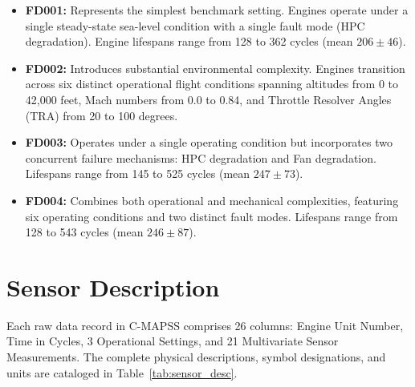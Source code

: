 \documentclass[12pt,a4paper,oneside]{report}
\begin{document}
\begin{itemize}
    \item \textbf{FD001:} Represents the simplest benchmark setting. Engines operate under a single steady-state sea-level condition with a single fault mode (HPC degradation). Engine lifespans range from 128 to 362 cycles (mean $206 \pm 46$).
    \item \textbf{FD002:} Introduces substantial environmental complexity. Engines transition across six distinct operational flight conditions spanning altitudes from 0 to 42,000 feet, Mach numbers from 0.0 to 0.84, and Throttle Resolver Angles (TRA) from 20 to 100 degrees.
    \item \textbf{FD003:} Operates under a single operating condition but incorporates two concurrent failure mechanisms: HPC degradation and Fan degradation. Lifespans range from 145 to 525 cycles (mean $247 \pm 73$).
    \item \textbf{FD004:} Combines both operational and mechanical complexities, featuring six operating conditions and two distinct fault modes. Lifespans range from 128 to 543 cycles (mean $246 \pm 87$).
\end{itemize}

\section{Sensor Description}
Each raw data record in C-MAPSS comprises 26 columns: Engine Unit Number, Time in Cycles, 3 Operational Settings, and 21 Multivariate Sensor Measurements. The complete physical descriptions, symbol designations, and units are cataloged in Table~\ref{tab:sensor_desc}.
\end{document}
